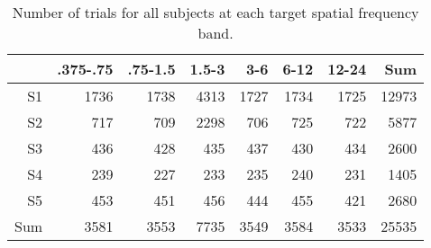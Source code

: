 \begin{table}[ht]
\centering
\begin{tabular}{rrrrrrrr}
  \hline
 & .375-.75 & .75-1.5 & 1.5-3 & 3-6 & 6-12 & 12-24 & Sum \\ 
  \hline
S1 & 1736 & 1738 & 4313 & 1727 & 1734 & 1725 & 12973 \\ 
  S2 & 717 & 709 & 2298 & 706 & 725 & 722 & 5877 \\ 
  S3 & 436 & 428 & 435 & 437 & 430 & 434 & 2600 \\ 
  S4 & 239 & 227 & 233 & 235 & 240 & 231 & 1405 \\ 
  S5 & 453 & 451 & 456 & 444 & 455 & 421 & 2680 \\ 
  Sum & 3581 & 3553 & 7735 & 3549 & 3584 & 3533 & 25535 \\ 
   \hline
\end{tabular}
\caption{Number of trials for all subjects at each target spatial frequency band.} 
\label{tab:trial_numbers_nas}
\end{table}

